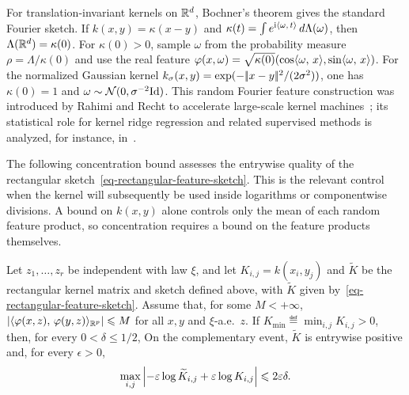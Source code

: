 For translation-invariant kernels on \(\mathbb{R}^d\), Bochner's theorem gives the standard Fourier sketch. If \(k(x,y)=\kappa(x-y)\) and \(\kappa(t)=\int e^{\mathrm{i}\langle \omega,\,t\rangle}\,d\Lambda(\omega)\), then \(\Lambda(\mathbb{R}^d)=\kappa(0)\). For $\kappa(0)>0$, sample $\omega$ from the probability measure $\rho=\Lambda/\kappa(0)$ and use the real feature
$\varphi(x,\omega)=\sqrt{\kappa(0)}(\cos\langle \omega,\,x\rangle,\sin\langle \omega,\,x\rangle)$.
For the normalized Gaussian kernel \(k_\sigma(x,y)=\exp(-|\!| x-y |\!|^2/(2\sigma^2))\), one has $\kappa(0)=1$ and \(\omega\sim\mathcal{N}(0,\sigma^{-2}\mathrm{Id})\). This random Fourier feature construction was introduced by Rahimi and Recht to accelerate large-scale kernel machines~\cite{RahimiRecht2007RandomFeatures}; its statistical role for kernel ridge regression and related supervised methods is analyzed, for instance, in~\cite{RudiRosasco2017RandomFeatures,AvronKapralovMusco2017RandomFourierKRR}.

The following concentration bound assesses the entrywise quality of the rectangular sketch~\eqref{eq-rectangular-feature-sketch}. This is the relevant control when the kernel will subsequently be used inside logarithms or componentwise divisions. A bound on $k(x,y)$ alone controls only the mean of each random feature product, so concentration requires a bound on the feature products themselves.

\begin{prop}
\label{prop-sinkhorn-sketch-positive-guarantee}
Let \(z_1,\ldots,z_r\) be independent with law \(\xi\), and let \(K_{i,j}=k(x_i,y_j)\) and \(\widetilde K\) be the rectangular kernel matrix and sketch defined above, with \(\widetilde K\) given by~\eqref{eq-rectangular-feature-sketch}. Assume that, for some \(M<+\infty\),
$\left\lvert\langle \varphi(x,z),\,\varphi(y,z)\rangle_{\mathbb{R}^p}\right\rvert\leqslant M$ for all $x,y$ and $\xi$-a.e.\ $z$.
If \(K_{\min}\eqdef\min_{i,j}K_{i,j}>0\), then, for every \(0<\delta\leq1/2\),
On the complementary event, \(\widetilde K\) is entrywise positive and, for every \(\epsilon>0\),
\[
	\max_{i,j}
	\left\lvert-\varepsilon\log\widetilde K_{i,j}+\varepsilon\log K_{i,j}\right\rvert
	\leqslant 2\varepsilon\delta.
\]
\end{prop}

